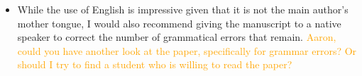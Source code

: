 \documentclass[10pt,a4paper]{article}
\newcommand{\Aaron}[1]{\textcolor{Orange}{#1}}
\begin{document}
\begin{itemize}
\item While the use of English is impressive given that it is not the main author's mother
tongue, I would also recommend giving the manuscript to a native speaker to correct
the number of grammatical errors that remain. \Aaron{Aaron, could you have another look at the paper, specifically for grammar errors? Or should I try to find a student who is willing to read the paper?}

\end{itemize}
\end{document}
